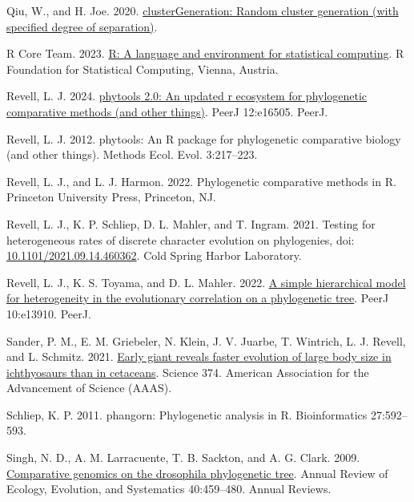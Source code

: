\documentclass[fleqn,10pt,lineno]{wlpeerj} %
\newlength{\cslhangindent}
\newenvironment{CSLReferences}[2] %
 {\begin{list}{}{%
  \setlength{\itemindent}{0pt}
  \setlength{\leftmargin}{0pt}
  \setlength{\parsep}{0pt}
  \ifodd #1
   \setlength{\leftmargin}{\cslhangindent}
   \setlength{\itemindent}{-1\cslhangindent}
  \fi
  \setlength{\itemsep}{#2\baselineskip}}}
 {\end{list}}
\begin{document}
\begin{CSLReferences}{1}{0}
Qiu, W., and H. Joe. 2020. \href{https://CRAN.R-project.org/package=clusterGeneration}{clusterGeneration: Random cluster generation (with specified degree of separation)}.

R Core Team. 2023. \href{https://www.R-project.org/}{R: A language and environment for statistical computing}. R Foundation for Statistical Computing, Vienna, Austria.

Revell, L. J. 2024. \href{https://doi.org/10.7717/peerj.16505}{{phytools} 2.0: An updated r ecosystem for phylogenetic comparative methods (and other things)}. PeerJ 12:e16505. PeerJ.

Revell, L. J. 2012. {phytools}: An {R} package for phylogenetic comparative biology (and other things). Methods Ecol. Evol. 3:217--223.

Revell, L. J., and L. J. Harmon. 2022. Phylogenetic comparative methods in {R}. Princeton University Press, Princeton, NJ.

Revell, L. J., K. P. Schliep, D. L. Mahler, and T. Ingram. 2021. Testing for heterogeneous rates of discrete character evolution on phylogenies, doi: \href{https://doi.org/10.1101/2021.09.14.460362}{10.1101/2021.09.14.460362}. Cold Spring Harbor Laboratory.

Revell, L. J., K. S. Toyama, and D. L. Mahler. 2022. \href{https://doi.org/10.7717/peerj.13910}{A simple hierarchical model for heterogeneity in the evolutionary correlation on a phylogenetic tree}. PeerJ 10:e13910. PeerJ.

Sander, P. M., E. M. Griebeler, N. Klein, J. V. Juarbe, T. Wintrich, L. J. Revell, and L. Schmitz. 2021. \href{https://doi.org/10.1126/science.abf5787}{Early giant reveals faster evolution of large body size in ichthyosaurs than in cetaceans}. Science 374. American Association for the Advancement of Science (AAAS).

Schliep, K. P. 2011. {phangorn}: Phylogenetic analysis in {R}. Bioinformatics 27:592--593.

Singh, N. D., A. M. Larracuente, T. B. Sackton, and A. G. Clark. 2009. \href{https://doi.org/10.1146/annurev.ecolsys.110308.120214}{Comparative genomics on the drosophila phylogenetic tree}. Annual Review of Ecology, Evolution, and Systematics 40:459--480. Annual Reviews.


\end{CSLReferences}
\end{document}

